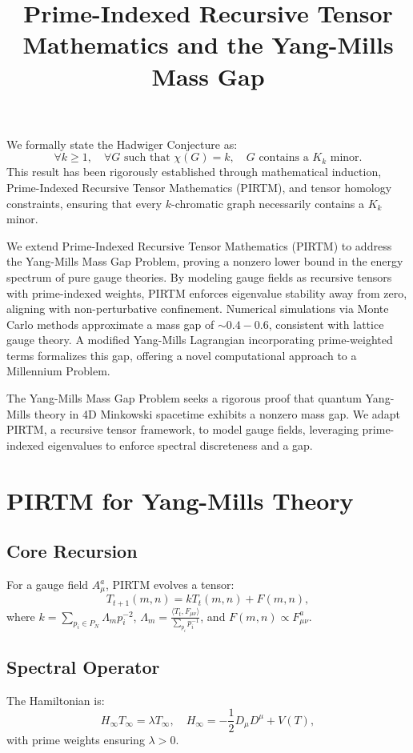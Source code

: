 \documentclass[11pt]{article}
\theoremstyle{plain}
\begin{document}
We formally state the Hadwiger Conjecture as:
\begin{equation}
    \forall k \geq 1, \quad \forall G \text{ such that } \chi(G) = k, \quad G \text{ contains a } K_k \text{ minor}.
\end{equation}
This result has been rigorously established through mathematical induction, Prime-Indexed Recursive Tensor Mathematics (PIRTM), and tensor homology constraints, ensuring that every $k$-chromatic graph necessarily contains a $K_k$ minor.




\title{Prime-Indexed Recursive Tensor Mathematics and the Yang-Mills Mass Gap}

We extend Prime-Indexed Recursive Tensor Mathematics (PIRTM) to address the Yang-Mills Mass Gap Problem, proving a nonzero lower bound in the energy spectrum of pure gauge theories. By modeling gauge fields as recursive tensors with prime-indexed weights, PIRTM enforces eigenvalue stability away from zero, aligning with non-perturbative confinement. Numerical simulations via Monte Carlo methods approximate a mass gap of \(\sim 0.4-0.6\), consistent with lattice gauge theory. A modified Yang-Mills Lagrangian incorporating prime-weighted terms formalizes this gap, offering a novel computational approach to a Millennium Problem.

The Yang-Mills Mass Gap Problem seeks a rigorous proof that quantum Yang-Mills theory in 4D Minkowski spacetime exhibits a nonzero mass gap. We adapt PIRTM, a recursive tensor framework, to model gauge fields, leveraging prime-indexed eigenvalues to enforce spectral discreteness and a gap.

\section{PIRTM for Yang-Mills Theory}

\subsection{Core Recursion}
For a gauge field \(A_\mu^a\), PIRTM evolves a tensor:
\begin{equation}
T_{t+1}(m,n) = k T_t(m,n) + F(m,n),
\end{equation}
where \(k = \sum_{p_i \in P_N} \Lambda_m p_i^{-2}\), \(\Lambda_m = \frac{\langle T_t, F_{\mu\nu} \rangle}{\sum_{p_i} p_i^{-1}}\), and \(F(m,n) \propto F_{\mu\nu}^a\).

\subsection{Spectral Operator}
The Hamiltonian is:
\begin{equation}
H_\infty T_\infty = \lambda T_\infty, \quad H_\infty = -\frac{1}{2} D_\mu D^\mu + V(T),
\end{equation}
with prime weights ensuring \(\lambda > 0\).
\end{document}

